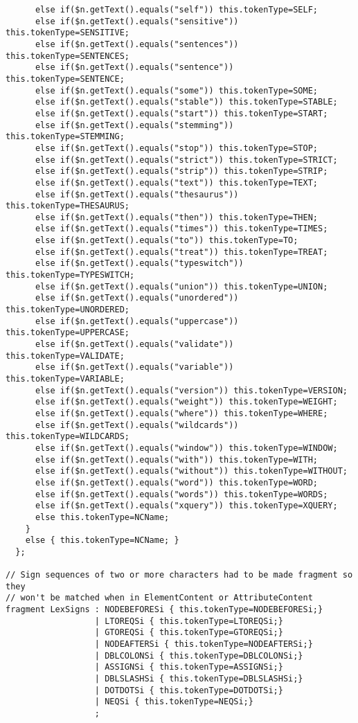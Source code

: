 \begin{verbatim}
      else if($n.getText().equals("self")) this.tokenType=SELF;
      else if($n.getText().equals("sensitive")) this.tokenType=SENSITIVE;
      else if($n.getText().equals("sentences")) this.tokenType=SENTENCES;
      else if($n.getText().equals("sentence")) this.tokenType=SENTENCE;
      else if($n.getText().equals("some")) this.tokenType=SOME;
      else if($n.getText().equals("stable")) this.tokenType=STABLE;
      else if($n.getText().equals("start")) this.tokenType=START;
      else if($n.getText().equals("stemming")) this.tokenType=STEMMING;
      else if($n.getText().equals("stop")) this.tokenType=STOP;
      else if($n.getText().equals("strict")) this.tokenType=STRICT;
      else if($n.getText().equals("strip")) this.tokenType=STRIP;
      else if($n.getText().equals("text")) this.tokenType=TEXT;
      else if($n.getText().equals("thesaurus")) this.tokenType=THESAURUS;
      else if($n.getText().equals("then")) this.tokenType=THEN;
      else if($n.getText().equals("times")) this.tokenType=TIMES;
      else if($n.getText().equals("to")) this.tokenType=TO;
      else if($n.getText().equals("treat")) this.tokenType=TREAT;
      else if($n.getText().equals("typeswitch")) this.tokenType=TYPESWITCH;
      else if($n.getText().equals("union")) this.tokenType=UNION;
      else if($n.getText().equals("unordered")) this.tokenType=UNORDERED;
      else if($n.getText().equals("uppercase")) this.tokenType=UPPERCASE;
      else if($n.getText().equals("validate")) this.tokenType=VALIDATE;
      else if($n.getText().equals("variable")) this.tokenType=VARIABLE;
      else if($n.getText().equals("version")) this.tokenType=VERSION;
      else if($n.getText().equals("weight")) this.tokenType=WEIGHT;
      else if($n.getText().equals("where")) this.tokenType=WHERE;
      else if($n.getText().equals("wildcards")) this.tokenType=WILDCARDS;
      else if($n.getText().equals("window")) this.tokenType=WINDOW;
      else if($n.getText().equals("with")) this.tokenType=WITH;
      else if($n.getText().equals("without")) this.tokenType=WITHOUT;
      else if($n.getText().equals("word")) this.tokenType=WORD;
      else if($n.getText().equals("words")) this.tokenType=WORDS;
      else if($n.getText().equals("xquery")) this.tokenType=XQUERY;
      else this.tokenType=NCName;
    }
    else { this.tokenType=NCName; }
  };
            
// Sign sequences of two or more characters had to be made fragment so they 
// won't be matched when in ElementContent or AttributeContent            
fragment LexSigns : NODEBEFORESi { this.tokenType=NODEBEFORESi;}       
                  | LTOREQSi { this.tokenType=LTOREQSi;}         
                  | GTOREQSi { this.tokenType=GTOREQSi;}         
                  | NODEAFTERSi { this.tokenType=NODEAFTERSi;}       
                  | DBLCOLONSi { this.tokenType=DBLCOLONSi;}       
                  | ASSIGNSi { this.tokenType=ASSIGNSi;}        
                  | DBLSLASHSi { this.tokenType=DBLSLASHSi;}                 
                  | DOTDOTSi { this.tokenType=DOTDOTSi;}        
                  | NEQSi { this.tokenType=NEQSi;}        
                  ;


\end{verbatim}
